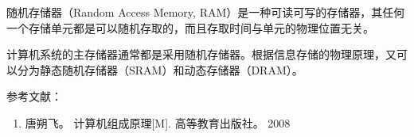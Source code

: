 
\begin{issues}
\issueDraft
\end{issues}

随机存储器（Random Access Memory, RAM）是一种可读可写的存储器，其任何一个存储单元都是可以随机存取的，而且存取时间与单元的物理位置无关。

计算机系统的主存储器通常都是采用随机存储器。根据信息存储的物理原理，又可以分为静态随机存储器（SRAM）和动态存储器（DRAM）。


参考文献：
\begin{enumerate}
\item 唐朔飞。 计算机组成原理[M]. 高等教育出版社。 2008
\end{enumerate}